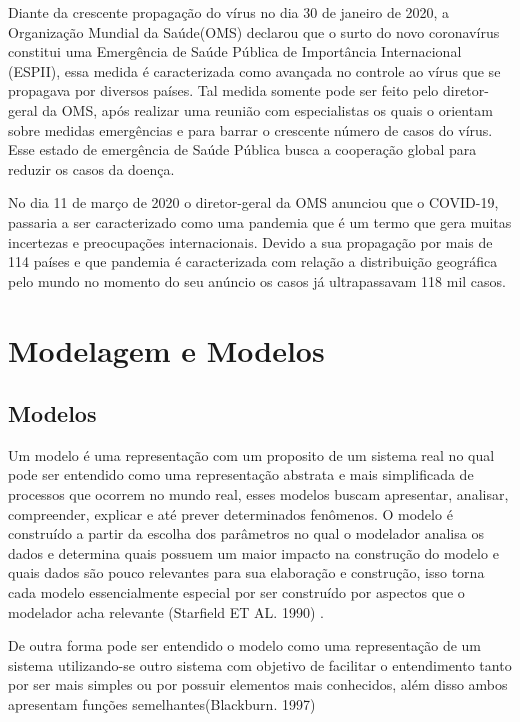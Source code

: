 Diante da crescente propagação do vírus no dia 30 de janeiro de 2020, a Organização Mundial da Saúde(OMS) declarou que o surto do novo coronavírus constitui uma Emergência de Saúde Pública de Importância Internacional (ESPII), essa medida é caracterizada como avançada no controle ao vírus que se propagava por diversos países. Tal medida somente pode ser feito pelo diretor-geral da OMS, após realizar uma reunião com especialistas os quais o orientam sobre medidas emergências e para barrar o crescente número de casos do vírus. Esse estado de emergência de Saúde Pública busca a cooperação global para reduzir os casos da doença.

No dia 11 de março de 2020 o diretor-geral da OMS anunciou que o COVID-19, passaria a ser caracterizado como uma pandemia que é um termo que gera muitas incertezas e preocupações internacionais. Devido a sua propagação por mais de 114 países e que pandemia é caracterizada com relação a distribuição geográfica pelo mundo  no momento do seu anúncio os casos já ultrapassavam 118 mil casos.

\section{Modelagem e Modelos}

\subsection{Modelos}

Um modelo é uma representação com um proposito de um sistema real no qual pode ser entendido como uma representação abstrata e mais simplificada de processos que ocorrem no mundo real, esses modelos buscam apresentar, analisar, compreender, explicar e até prever determinados fenômenos. O modelo é construído a partir da escolha dos parâmetros no qual o modelador analisa os dados e determina quais possuem um maior impacto na construção do modelo e quais dados são pouco relevantes para sua elaboração e construção, isso torna cada modelo essencialmente especial por ser construído por aspectos que o modelador acha relevante (Starfield ET AL. 1990) \cite{Qualitat24:online}. 

De outra forma pode ser entendido o modelo como uma representação de um sistema utilizando-se outro sistema com objetivo de facilitar o entendimento tanto por ser mais simples ou por possuir elementos mais conhecidos, além disso ambos apresentam funções semelhantes(Blackburn. 1997)\cite{blackburn}


